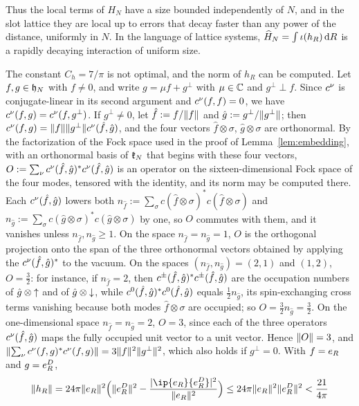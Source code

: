 Thus the local terms of $H_N$ have a size bounded independently of $N$, and in the slot lattice they are
local up to errors that decay faster than any power of the distance, uniformly in $N$. In the language of
lattice systems, $\widehat{H}_N=\int\iota(h_R)\,\mathrm{d} R$ is a rapidly decaying interaction of uniform size.

The constant $C_h=7/\pi$ is not optimal, and the norm of $h_R$ can be computed. Let $f,g\in\mathfrak{h}_N$ with $f\ne0$, and
write $g=\mu f+g^\perp$ with $\mu\in\mathbb{C}$ and $g^\perp\perp f$. Since $c^{\nu}$ is conjugate-linear in its second
argument and $c^{\nu}(f,f)=0$, we have $c^{\nu}(f,g)=c^{\nu}(f,g^\perp)$. If $g^\perp\ne0$, let
$\hat f:=f/\lVert f\rVert$ and $\hat g:=g^\perp/\lVert g^\perp\rVert$; then $c^{\nu}(f,g)=\lVert f\rVert\lVert g^\perp\rVert c^{\nu}(\hat f,\hat g)$, and
the four vectors $\hat f\otimes\sigma$, $\hat g\otimes\sigma$ are orthonormal. By the factorization of the Fock space used in
the proof of Lemma~\ref{lem:embedding}, with an orthonormal basis of $\mathfrak{k}_N$ that begins with these four vectors,
$O:=\sum_\nu c^{\nu}(\hat f,\hat g)^*c^{\nu}(\hat f,\hat g)$ is an operator on the sixteen-dimensional Fock space of the four
modes, tensored with the identity, and its norm may be computed there. Each $c^{\nu}(\hat f,\hat g)$ lowers both
$n_{\hat f}:=\sum_\sigma c(\hat f\otimes\sigma)^*c(\hat f\otimes\sigma)$ and $n_{\hat g}:=\sum_\sigma c(\hat g\otimes\sigma)^*c(\hat g\otimes\sigma)$ by
one, so $O$ commutes with them, and it vanishes unless $n_{\hat f},n_{\hat g}\ge1$. On the space
$n_{\hat f}=n_{\hat g}=1$, $O$ is the orthogonal projection onto the span of the three orthonormal vectors obtained by
applying the $c^{\nu}(\hat f,\hat g)^*$ to the vacuum. On the spaces $(n_{\hat f},n_{\hat g})=(2,1)$ and $(1,2)$, $O=\frac32$:
for instance, if $n_{\hat f}=2$, then $c^{\pm}(\hat f,\hat g)^*c^{\pm}(\hat f,\hat g)$ are the occupation numbers of
$\hat g\otimes{\uparrow}$ and of $\hat g\otimes{\downarrow}$, while $c^{0}(\hat f,\hat g)^*c^{0}(\hat f,\hat g)$ equals $\frac12n_{\hat g}$, its
spin-exchanging cross terms vanishing because both modes $\hat f\otimes\sigma$ are occupied; so $O=\frac32n_{\hat g}=\frac32$. On the
one-dimensional space $n_{\hat f}=n_{\hat g}=2$, $O=3$, since each of the three operators $c^{\nu}(\hat f,\hat g)$ maps the
fully occupied unit vector to a unit vector. Hence $\lVert O\rVert=3$, and
$\lVert\sum_\nu c^{\nu}(f,g)^*c^{\nu}(f,g)\rVert=3\lVert f\rVert^2\lVert g^\perp\rVert^2$, which also holds if $g^\perp=0$. With $f=e_{R}$
and $g=e^{D}_{R}$,
\[
\norm{h_R}=24\pi\norm{\ev R}^2\Bigl(\norm{\evD R}^2-\frac{\abs{\ip{\ev R}{\evD R}}^2}{\norm{\ev R}^2}\Bigr)
\le24\pi\norm{\ev R}^2\norm{\evD R}^2<\frac{21}{4\pi}
\]
